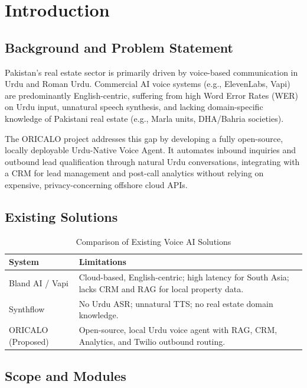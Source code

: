 \chapter{Introduction}
\label{ch:introduction}

\section{Background and Problem Statement}

Pakistan's real estate sector is primarily driven by voice-based communication in Urdu and Roman Urdu. Commercial AI voice systems (e.g., ElevenLabs, Vapi) are predominantly English-centric, suffering from high Word Error Rates (WER) on Urdu input, unnatural speech synthesis, and lacking domain-specific knowledge of Pakistani real estate (e.g., Marla units, DHA/Bahria societies). 

The ORICALO project addresses this gap by developing a fully open-source, locally deployable Urdu-Native Voice Agent. It automates inbound inquiries and outbound lead qualification through natural Urdu conversations, integrating with a CRM for lead management and post-call analytics without relying on expensive, privacy-concerning offshore cloud APIs.

\section{Existing Solutions}

\begin{table}[H]
\centering
\caption{Comparison of Existing Voice AI Solutions}
\renewcommand{\arraystretch}{1.2}
\begin{tabular}{|p{3cm}|p{11cm}|}
\hline
\textbf{System} & \textbf{Limitations} \\ \hline
Bland AI / Vapi & Cloud-based, English-centric; high latency for South Asia; lacks CRM and RAG for local property data. \\ \hline
Synthflow & No Urdu ASR; unnatural TTS; no real estate domain knowledge. \\ \hline
ORICALO (Proposed) & Open-source, local Urdu voice agent with RAG, CRM, Analytics, and Twilio outbound routing. \\ \hline
\end{tabular}
\label{tab:existing-solutions}
\end{table}

\section{Scope and Modules}

